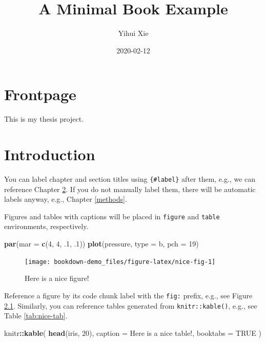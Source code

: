 \documentclass[
]{book}
\title{A Minimal Book Example}
\author{Yihui Xie}
\date{2020-02-12}
\newenvironment{Shaded}{\begin{snugshade}}{\end{snugshade}}
\newcommand{\DataTypeTok}[1]{\textcolor[rgb]{0.13,0.29,0.53}{#1}}
\newcommand{\DecValTok}[1]{\textcolor[rgb]{0.00,0.00,0.81}{#1}}
\newcommand{\FloatTok}[1]{\textcolor[rgb]{0.00,0.00,0.81}{#1}}
\newcommand{\KeywordTok}[1]{\textcolor[rgb]{0.13,0.29,0.53}{\textbf{#1}}}
\newcommand{\NormalTok}[1]{#1}
\newcommand{\OperatorTok}[1]{\textcolor[rgb]{0.81,0.36,0.00}{\textbf{#1}}}
\newcommand{\OtherTok}[1]{\textcolor[rgb]{0.56,0.35,0.01}{#1}}
\newcommand{\StringTok}[1]{\textcolor[rgb]{0.31,0.60,0.02}{#1}}
\begin{document}
\maketitle

{
\setcounter{tocdepth}{1}
\tableofcontents
}
\hypertarget{frontpage}{%
\chapter{Frontpage}\label{frontpage}}

This is my thesis project.

\hypertarget{intro}{%
\chapter{Introduction}\label{intro}}

You can label chapter and section titles using \texttt{\{\#label\}} after them, e.g., we can reference Chapter \ref{intro}. If you do not manually label them, there will be automatic labels anyway, e.g., Chapter \ref{methods}.

Figures and tables with captions will be placed in \texttt{figure} and \texttt{table} environments, respectively.

\begin{Shaded}
\begin{Highlighting}[]
\KeywordTok{par}\NormalTok{(}\DataTypeTok{mar =} \KeywordTok{c}\NormalTok{(}\DecValTok{4}\NormalTok{, }\DecValTok{4}\NormalTok{, }\FloatTok{.1}\NormalTok{, }\FloatTok{.1}\NormalTok{))}
\KeywordTok{plot}\NormalTok{(pressure, }\DataTypeTok{type =} \StringTok{\textquotesingle{}b\textquotesingle{}}\NormalTok{, }\DataTypeTok{pch =} \DecValTok{19}\NormalTok{)}
\end{Highlighting}
\end{Shaded}

\begin{figure}

{\centering \texttt{[image: bookdown-demo\_files/figure-latex/nice-fig-1]} 

}

\caption{Here is a nice figure!}\label{fig:nice-fig}
\end{figure}

Reference a figure by its code chunk label with the \texttt{fig:} prefix, e.g., see Figure \ref{fig:nice-fig}. Similarly, you can reference tables generated from \texttt{knitr::kable()}, e.g., see Table \ref{tab:nice-tab}.

\begin{Shaded}
\begin{Highlighting}[]
\NormalTok{knitr}\OperatorTok{::}\KeywordTok{kable}\NormalTok{(}
  \KeywordTok{head}\NormalTok{(iris, }\DecValTok{20}\NormalTok{), }\DataTypeTok{caption =} \StringTok{\textquotesingle{}Here is a nice table!\textquotesingle{}}\NormalTok{,}
  \DataTypeTok{booktabs =} \OtherTok{TRUE}
\NormalTok{)}
\end{Highlighting}
\end{Shaded}
\end{document}
